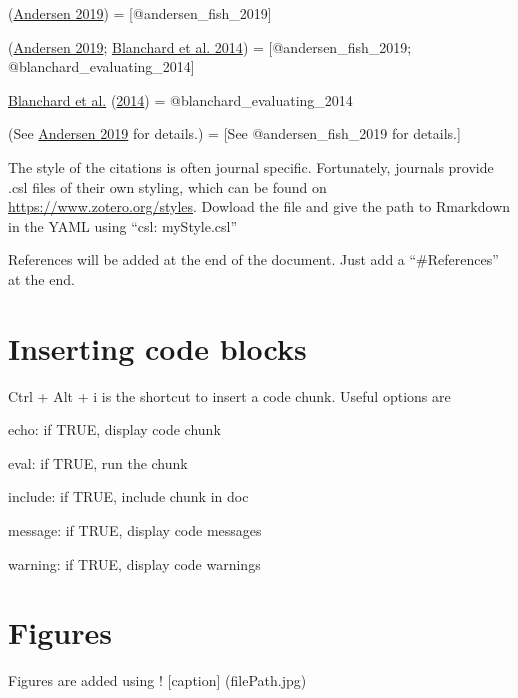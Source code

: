 \documentclass[
  11pt,
]{article}
\begin{document}
(\protect\hyperlink{ref-andersen_fish_2019}{Andersen 2019}) = {[}@andersen\_fish\_2019{]}

(\protect\hyperlink{ref-andersen_fish_2019}{Andersen 2019}; \protect\hyperlink{ref-blanchard_evaluating_2014}{Blanchard et al. 2014}) = {[}@andersen\_fish\_2019; @blanchard\_evaluating\_2014{]}

\protect\hyperlink{ref-blanchard_evaluating_2014}{Blanchard et al.} (\protect\hyperlink{ref-blanchard_evaluating_2014}{2014}) = @blanchard\_evaluating\_2014

(See \protect\hyperlink{ref-andersen_fish_2019}{Andersen 2019} for details.) = {[}See @andersen\_fish\_2019 for details.{]}

The style of the citations is often journal specific. Fortunately, journals provide .csl files of their own styling, which can be found on \url{https://www.zotero.org/styles}. Dowload the file and give the path to Rmarkdown in the YAML using ``csl: myStyle.csl''

References will be added at the end of the document. Just add a ``\#References'' at the end.

\hypertarget{inserting-code-blocks}{%
\section{Inserting code blocks}\label{inserting-code-blocks}}

Ctrl + Alt + i is the shortcut to insert a code chunk. Useful options are

echo: if TRUE, display code chunk

eval: if TRUE, run the chunk

include: if TRUE, include chunk in doc

message: if TRUE, display code messages

warning: if TRUE, display code warnings

\hypertarget{figures}{%
\section{Figures}\label{figures}}

Figures are added using ! {[}caption{]} (filePath.jpg)
\end{document}
